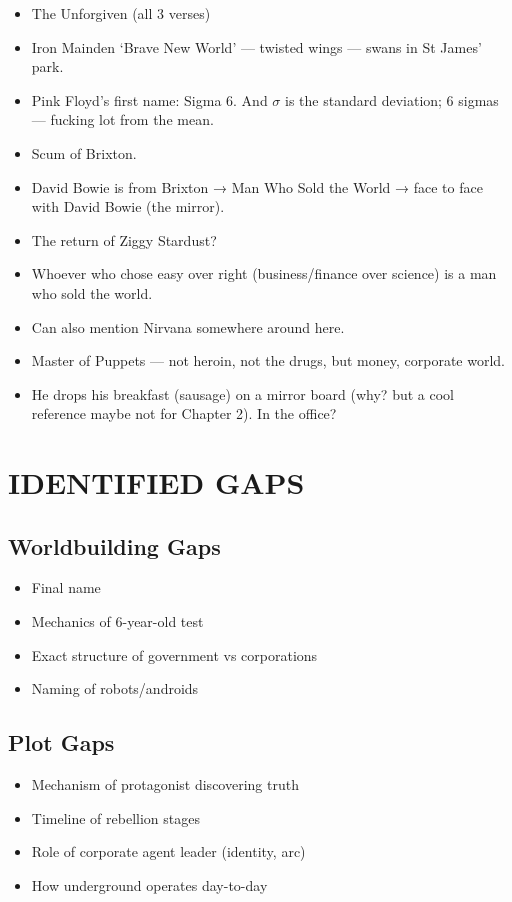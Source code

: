 \documentclass[12pt]{article}
\begin{document}
\begin{itemize}
  \item The Unforgiven (all 3 verses)
  \item Iron Mainden ‘Brave New World’ — twisted wings — swans in St James’ park.
  \item Pink Floyd’s first name: Sigma 6. And \(\sigma\) is the standard deviation; 6 sigmas — fucking lot from the mean.
  \item Scum of Brixton.
  \item David Bowie is from Brixton → Man Who Sold the World → face to face with David Bowie (the mirror).
  \item The return of Ziggy Stardust?
  \item Whoever who chose easy over right (business/finance over science) is a man who sold the world.
  \item Can also mention Nirvana somewhere around here.
  \item Master of Puppets — not heroin, not the drugs, but money, corporate world.
  \item He drops his breakfast (sausage) on a mirror board (why? but a cool reference maybe not for Chapter 2). In the office?
\end{itemize}

\section{IDENTIFIED GAPS}

\subsection{Worldbuilding Gaps}

\begin{itemize}
  \item Final name 
  \item Mechanics of 6-year-old test
  \item Exact structure of government vs corporations
  \item Naming of robots/androids
\end{itemize}

\subsection{Plot Gaps}

\begin{itemize}
  \item Mechanism of protagonist discovering truth
  \item Timeline of rebellion stages
  \item Role of corporate agent leader (identity, arc)
  \item How underground operates day-to-day
\end{itemize}
\end{document}
